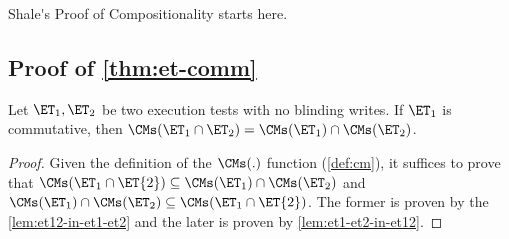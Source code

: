 \ac{Shale's Proof of Compositionality starts here.}

\subsection{Proof of \cref{thm:et-comm}}
\label{sec:et-comm}
\begin{theorem}
\label{thm:appendix-et-composition-1}
Let $\ET_1, \ET_2$ be two execution tests with no blinding writes. 
If $\ET_1$ is commutative, then $\CMs(\ET_1 \cap \ET_2) = \CMs(\ET_1) \cap \CMs(\ET_2)$. 
\end{theorem}
\begin{proof}
Given the definition of the \( \CMs(.) \) function (\cref{def:cm}), 
it suffices to prove that \( \CMs(\ET_{1} \cap \ET{2}) \subseteq \CMs(\ET_1) \cap \CMs(\ET_2) \)
and \( \CMs(\ET_1) \cap \CMs(\ET_2) \subseteq \CMs(\ET_{1} \cap \ET{2}) \).
The former is proven by the \cref{lem:et12-in-et1-et2} and the later is proven by \cref{lem:et1-et2-in-et12}.
\end{proof}

